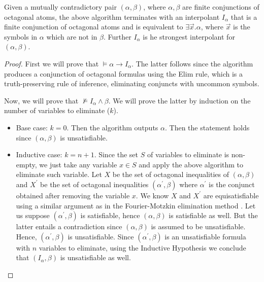 \begin{theorem}
  Given a mutually contradictory pair $(\alpha, \beta)$,
  where $\alpha, \beta$ are finite conjunctions of octagonal
  atoms, the above algorithm terminates with an interpolant
  $I_\alpha$ that is a finite conjunction of octagonal atoms
  and is equivalent to $\exists \vec{x}. \alpha$, where
  $\vec{x}$ is the symbols in $\alpha$ which are not in
  $\beta$. Further $I_\alpha$ is he strongest interpolant
  for $(\alpha, \beta)$.
\end{theorem}

\begin{proof}
  First we will prove that $\models \alpha \rightarrow I_\alpha$.
  The latter follows since the algorithm produces a
  conjunction of octagonal formulas using the Elim rule,
  which is a truth-preserving rule of inference, eliminating
  conjuncts with uncommon symbols.
  
  Now, we will prove that $\not\models I_\alpha \land \beta$. We
  will prove the latter by induction on the number of variables
  to eliminate ($k$).

  \begin{itemize}
  \item Base case: $k = 0$. Then the algorithm outputs $\alpha$.
    Then the statement holds since $(\alpha, \beta)$
    is unsatisfiable.
  \item Inductive case: $k = n + 1$. Since the set $S$ of variables to eliminate
    is non-empty, we just take any variable $x \in S$ and apply the
    above algorithm to eliminate such variable.
    Let $X$ be the set of octagonal inequalities of $(\alpha, \beta)$
    and $X^{'}$ be the set of octagonal inequalities $(\alpha^{'}, \beta)$
    where $\alpha^{'}$ is the conjunct obtained after removing the
    variable $x$. We know $X$ and $X^{'}$ are equisatisfiable using
    a similar argument as in the Fourier-Motzkin elimination
    method \cite{10.5555/17634}. Let us suppose
    $(\alpha^{'}, \beta)$ is satisfiable, hence $(\alpha, \beta)$
    is satisfiable as well. But the latter entails a contradiction
    since $(\alpha, \beta)$ is assumed to be unsatisfiable. Hence,
    $(\alpha^{'}, \beta)$ is unsatisfiable. Since $(\alpha^{'}, \beta)$
    is an unsatisfiable formula with $n$ variables to eliminate,
    using the Inductive Hypothesis we conclude that $(I_\alpha, \beta)$
    is unsatisfiable as well.
  \end{itemize}
  
\end{proof}

